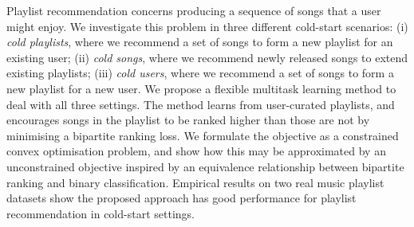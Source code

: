 
Playlist recommendation concerns producing a sequence of songs that a user might enjoy.
We investigate this problem in three different cold-start scenarios:
(i) \emph{cold playlists}, where we recommend a set of songs to form a new playlist for an existing user; %
(ii) \emph{cold songs}, where we recommend newly released songs to extend existing playlists;
(iii) \emph{cold users}, where we recommend a set of songs to form a new playlist for a new user. %
%
We propose a flexible multitask learning method to deal with all three settings.
The method learns from user-curated playlists,
and encourages songs in the playlist 
to be ranked higher than those are not
by minimising a %
bipartite ranking loss.
We formulate the objective as a constrained convex optimisation problem,
and show how this may be approximated by an unconstrained objective
inspired by an equivalence relationship between bipartite ranking and binary classification.
Empirical results on two real music playlist datasets show the proposed approach has good performance for playlist recommendation
in cold-start settings.
